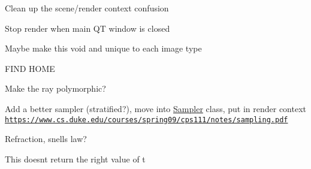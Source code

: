 
\begin{DoxyRefList}
\item[\label{todo__todo000003}%
\hypertarget{todo__todo000003}{}%
Member \hyperlink{classGLWindow_afa32b188a2c32efb856380c59f966c50}{G\+L\+Window\+:\+:render\+Scene} (\hyperlink{structRenderer_1_1RenderContext}{Renderer\+::\+Render\+Context} $\ast$\+\_\+context)]Clean up the scene/render context confusion 

Stop render when main Q\+T window is closed  
\item[\label{todo__todo000001}%
\hypertarget{todo__todo000001}{}%
Member \hyperlink{classImage_a917680d514864d303cd210fcf3d52299}{Image\+:\+:m\+\_\+image} ]Maybe make this void and unique to each image type  
\item[\label{todo__todo000007}%
\hypertarget{todo__todo000007}{}%
Member \hyperlink{namespaceRenderer_a5c15206bdfc218143abbf8d7c82364d8}{Renderer\+:\+:M\+A\+X\+\_\+\+O\+P\+T\+I\+C\+A\+L\+\_\+\+R\+E\+C\+U\+R\+S\+I\+O\+N\+\_\+\+D\+E\+P\+T\+H} ]F\+I\+N\+D H\+O\+M\+E  
\item[\label{todo__todo000002}%
\hypertarget{todo__todo000002}{}%
Member \hyperlink{structRenderer_1_1Ray_a174d2a110f464b0715f689b9eb664cad}{Renderer\+:\+:Ray\+:\+:Ray} (const ngl\+::\+Vec3 \&\+\_\+origin, const ngl\+::\+Vec3 \&\+\_\+direction, Ray\+Type \+\_\+type=U\+N\+K\+N\+O\+W\+N, float \+\_\+near=0.\+0, float \+\_\+far=std\+::numeric\+\_\+limits$<$ float $>$\+::max())]Make the ray polymorphic?  
\item[\label{todo__todo000006}%
\hypertarget{todo__todo000006}{}%
Member \hyperlink{namespaceRenderer_ab4e56fa4911b200479ea79e6f43079d0}{Renderer\+:\+:render} (\hyperlink{structRenderer_1_1RenderContext}{Render\+Context} $\ast$\+\_\+context)]Add a better sampler (stratified?), move into \hyperlink{classSampler}{Sampler} class, put in render context \href{https://www.cs.duke.edu/courses/spring09/cps111/notes/sampling.pdf}{\tt https\+://www.\+cs.\+duke.\+edu/courses/spring09/cps111/notes/sampling.\+pdf}  
\item[\label{todo__todo000005}%
\hypertarget{todo__todo000005}{}%
Member \hyperlink{namespaceRenderer_a5889ab8316b510a8dc208452fc14a76c}{Renderer\+:\+:shade} (\hyperlink{structRenderer_1_1RenderContext}{Render\+Context} $\ast$\+\_\+context)]Refraction, snell\textquotesingle{}s law?  
\item[\label{todo__todo000008}%
\hypertarget{todo__todo000008}{}%
Member \hyperlink{classRenderer_1_1Triangle_af9802d9321c1fcdeb3aae9364efd246c}{Renderer\+:\+:Triangle\+:\+:intersect} (const \hyperlink{structRenderer_1_1Ray}{Ray} \&\+\_\+ray, \hyperlink{structRenderer_1_1HitData}{Hit\+Data} \&\+\_\+hit) const ]This doesn\textquotesingle{}t return the right value of t 
\end{DoxyRefList}